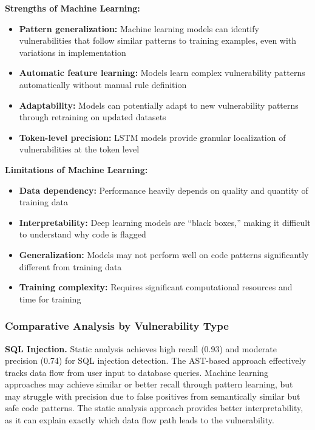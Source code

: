 \textbf{Strengths of Machine Learning:}
\begin{itemize}
	\item \textbf{Pattern generalization:} Machine learning models can identify vulnerabilities that follow similar patterns to training examples, even with variations in implementation
	\item \textbf{Automatic feature learning:} Models learn complex vulnerability patterns automatically without manual rule definition
	\item \textbf{Adaptability:} Models can potentially adapt to new vulnerability patterns through retraining on updated datasets
	\item \textbf{Token-level precision:} LSTM models provide granular localization of vulnerabilities at the token level
\end{itemize}

\textbf{Limitations of Machine Learning:}
\begin{itemize}
	\item \textbf{Data dependency:} Performance heavily depends on quality and quantity of training data
	\item \textbf{Interpretability:} Deep learning models are ``black boxes,'' making it difficult to understand why code is flagged
	\item \textbf{Generalization:} Models may not perform well on code patterns significantly different from training data
	\item \textbf{Training complexity:} Requires significant computational resources and time for training
\end{itemize}

\subsubsection{Comparative Analysis by Vulnerability Type}
\label{sec:comparative_by_type}

\textbf{SQL Injection.}
Static analysis achieves high recall (0.93) and moderate precision (0.74) for SQL injection detection. The AST-based approach effectively tracks data flow from user input to database queries. Machine learning approaches may achieve similar or better recall through pattern learning, but may struggle with precision due to false positives from semantically similar but safe code patterns. The static analysis approach provides better interpretability, as it can explain exactly which data flow path leads to the vulnerability.

